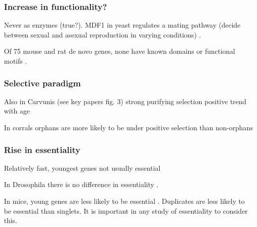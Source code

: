   \subsubsection{Increase in functionality?}
        
    Never as enzymes (true?). MDF1 in yeast regulates a mating pathway
    (decide between sexual and asexual reproduction in varying
    conditions) \cite{li_novo_2010}.

    Of 75 mouse and rat de novo genes, none have known domains or
    functional motifs \cite{murphy_novo_2012}.

  \subsubsection{Selective paradigm}


    Also in Carvunis (see key papers fig. 3) strong purifying selection
    positive trend with age \cite{carvunis_proto-genes_2012}


    In corrals orphans are more likely to be under positive selection
    than non-orphans \cite{voolstra_rapid_2011}


    \FloatBarrier

  \subsubsection{Rise in essentiality}

    Relatively fast, youngest genes not usually essential
    \cite{abrusan_integration_2013}

    In Drosophila there is no difference in essentiality
    \cite{chen_new_2010}. 

    In mice, young genes are less likely to be essential
    \cite{chen_younger_2012}. Duplicates are less likely to be essential
    than singlets. It is important in any study of essentiality to consider
    this.


